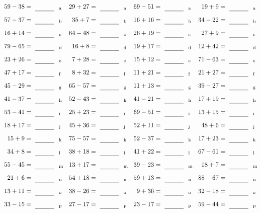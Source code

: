 \documentclass
[
  draft    = true,
  fontsize = 11pt,
  parskip  = half-
]
{scrartcl}
\begin{document}
\clearpage
\begin{align*}
    \pline{59-38}&=\rline{a}
  & \pline{29+27}&=\rline{a}
  & \pline{69-51}&=\rline{a}
  & \pline{19+9}&=\rline{a} \\[1ex]
    \pline{57-37}&=\rline{b}
  & \pline{35+7}&=\rline{b}
  & \pline{16+16}&=\rline{b}
  & \pline{34-22}&=\rline{b} \\[1ex]
    \pline{16+14}&=\rline{c}
  & \pline{64-48}&=\rline{c}
  & \pline{26+19}&=\rline{c}
  & \pline{27+9}&=\rline{c} \\[1ex]
    \pline{79-65}&=\rline{d}
  & \pline{16+8}&=\rline{d}
  & \pline{19+17}&=\rline{d}
  & \pline{12+42}&=\rline{d} \\[1ex]
    \pline{23+26}&=\rline{e}
  & \pline{7+28}&=\rline{e}
  & \pline{15+12}&=\rline{e}
  & \pline{71-63}&=\rline{e} \\[1ex]
    \pline{47+17}&=\rline{f}
  & \pline{8+32}&=\rline{f}
  & \pline{11+21}&=\rline{f}
  & \pline{21+27}&=\rline{f} \\[1ex]
    \pline{45-29}&=\rline{g}
  & \pline{65-57}&=\rline{g}
  & \pline{11+13}&=\rline{g}
  & \pline{39-27}&=\rline{g} \\[1ex]
    \pline{41-37}&=\rline{h}
  & \pline{52-43}&=\rline{h}
  & \pline{41-21}&=\rline{h}
  & \pline{17+19}&=\rline{h} \\[1ex]
    \pline{53-41}&=\rline{i}
  & \pline{25+23}&=\rline{i}
  & \pline{69-51}&=\rline{i}
  & \pline{13+15}&=\rline{i} \\[1ex]
    \pline{18+17}&=\rline{j}
  & \pline{45+36}&=\rline{j}
  & \pline{52+11}&=\rline{j}
  & \pline{48+6}&=\rline{j} \\[1ex]
    \pline{15+9}&=\rline{k}
  & \pline{75-57}&=\rline{k}
  & \pline{52-37}&=\rline{k}
  & \pline{17+23}&=\rline{k} \\[1ex]
    \pline{34+8}&=\rline{l}
  & \pline{38+18}&=\rline{l}
  & \pline{41+22}&=\rline{l}
  & \pline{67-61}&=\rline{l} \\[1ex]
    \pline{55-45}&=\rline{m}
  & \pline{13+17}&=\rline{m}
  & \pline{39-23}&=\rline{m}
  & \pline{18+7}&=\rline{m} \\[1ex]
    \pline{21+6}&=\rline{n}
  & \pline{54+18}&=\rline{n}
  & \pline{59+13}&=\rline{n}
  & \pline{88-67}&=\rline{n} \\[1ex]
    \pline{13+11}&=\rline{o}
  & \pline{38-26}&=\rline{o}
  & \pline{9+36}&=\rline{o}
  & \pline{32-18}&=\rline{o} \\[1ex]
    \pline{33-15}&=\rline{p}
  & \pline{27-17}&=\rline{p}
  & \pline{23-17}&=\rline{p}
  & \pline{59-44}&=\rline{p}
\end{align*}
\end{document}
